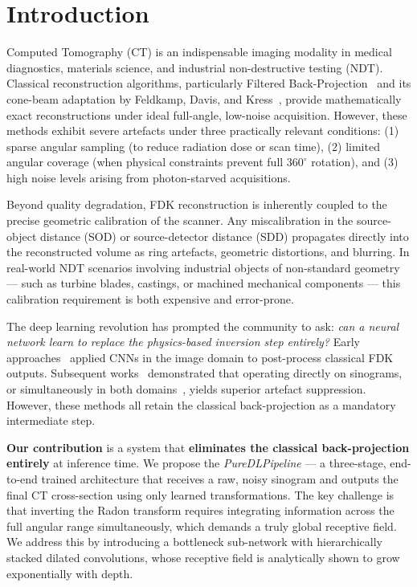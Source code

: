 \documentclass[10pt,twocolumn]{article}
\begin{document}
\section{Introduction}
\label{sec:intro}

Computed Tomography (CT) is an indispensable imaging modality in
medical diagnostics, materials science, and industrial non-destructive
testing (NDT).
Classical reconstruction algorithms, particularly Filtered
Back-Projection~\cite{kak2001} and its cone-beam adaptation by
Feldkamp, Davis, and Kress~\cite{feldkamp1984}, provide mathematically
exact reconstructions under ideal full-angle, low-noise acquisition.
However, these methods exhibit severe artefacts under three practically
relevant conditions: (1) sparse angular sampling (to reduce radiation
dose or scan time), (2) limited angular coverage (when physical
constraints prevent full $360^\circ$ rotation), and (3) high noise
levels arising from photon-starved acquisitions.

Beyond quality degradation, FDK reconstruction is inherently coupled
to the precise geometric calibration of the scanner.
Any miscalibration in the source-object distance (SOD) or
source-detector distance (SDD) propagates directly into the
reconstructed volume as ring artefacts, geometric distortions,
and blurring.
In real-world NDT scenarios involving industrial objects of
non-standard geometry --- such as turbine blades, castings, or
machined mechanical components --- this calibration requirement is
both expensive and error-prone.

The deep learning revolution has prompted the community to ask:
\textit{can a neural network learn to replace the physics-based
inversion step entirely?}
Early approaches~\cite{jin2017,chen2017} applied CNNs in the image
domain to post-process classical FDK outputs.
Subsequent works~\cite{han2016,lee2018} demonstrated that operating
directly on sinograms, or simultaneously in both domains~\cite{hu2020},
yields superior artefact suppression.
However, these methods all retain the classical back-projection as a
mandatory intermediate step.

\textbf{Our contribution} is a system that \textbf{eliminates the
classical back-projection entirely} at inference time.
We propose the \emph{PureDLPipeline} --- a three-stage, end-to-end
trained architecture that receives a raw, noisy sinogram and outputs
the final CT cross-section using only learned transformations.
The key challenge is that inverting the Radon transform requires
integrating information across the full angular range simultaneously,
which demands a truly global receptive field.
We address this by introducing a bottleneck sub-network with
hierarchically stacked dilated convolutions, whose receptive field
is analytically shown to grow exponentially with depth.
\end{document}
